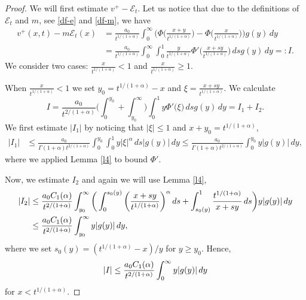 \documentclass{article}
\def\sE{{\mathscr{E}}}
\begin{document}
\begin{proof} We will first estimate $v^+ - \sE_t$.
Let us notice that due to the definitions of $\sE_t$ and $m$, see \eqref{df-e} and \eqref{df-m}, we have
\begin{align*}
v^+(x,t) - m\sE_t(x) &= \frac{a_0}{t^{1/(1+\alpha)}}
\int_0^\infty
\bigg( \Phi \bigg(\frac{x+y}{t^{1/(1+\alpha)}}\bigg)
-  \Phi \bigg(\frac{x}{t^{1/(1+\alpha)}}\bigg)\bigg)g(y)\, dy\\
&= \frac{a_0}{t^{1/(1+\alpha)}}
\int_0^\infty \int_0^1 \frac{y}{t^{1/(1+\alpha)}}
\Phi'\bigg(\frac{x+sy}{t^{1/(1+\alpha)}}\bigg)\, ds g(y)\, dy =:I
.
\end{align*}
We consider two cases: $\frac{x}{t^{1/(1+\alpha)}}< 1$ and  $\frac{x}{t^{1/(1+\alpha)}} \ge 1$. 

When $\frac{x}{t^{1/(1+\alpha)}}< 1$ we set $y_0 = t^{1/(1+\alpha)}- x$ and $\xi=\frac{x+sy}{t^{1/(1+\alpha)}}$. We calculate
$$
I = \frac{a_0}{t^{2/(1+\alpha)}} \bigg(\int_0^{y_0} + \int_{y_0}^\infty\bigg)\int_0^1 y \Phi'\big(\xi%
\big)\, ds g(y)\, dy = I_1 + I_2.
$$
We first estimate $|I_1|$ by noticing that $|\xi|\le1$ and $x+y_0= t^{1/(1+\alpha)}$,
\begin{align*}
 |I_1| &\le \frac{a_0}{\Gamma(1+\alpha)t^{2/(1+\alpha)}} \int_0^{y_0} \int_0^1y| \xi|^\alpha
\, ds |g(y)|\, dy
\le \frac{a_0}{\Gamma(1+\alpha)t^{2/(1+\alpha)}} 
\int_0^{y_0} y| g(y)| \, dy,   
\end{align*}
where we applied  Lemma \ref{l4} to bound $\Phi'.$

Now, we estimate $I_2$  and again we will use Lemma \ref{l4},
\begin{align*}
 |I_2 |&\le 
 \frac{a_0 C_1(\alpha)}%
 {t^{2/(1+\alpha)}} \int_{y_0}^\infty \bigg(
 \int_0^{s_0(y)} \bigg(\frac{x+sy}{t^{1/(1+\alpha)}}\bigg)^\alpha \, ds + \int_{s_0(y)}^1 
 \frac {t^{1/(1+\alpha)}}{x+sy}\,ds \bigg)y|g(y)|\, dy\\ &
 \le \frac{a_0 C_1(\alpha)}{%
 t^{2/(1+\alpha)}} \int_{y_0}^\infty y |g(y)|\, dy,
\end{align*}
where we set $s_0(y) = (t^{1/(1+\alpha)}-x)/y$ for $y\ge y_0$. %
Hence,
$$
|I| \le \frac{a_0 C_1(\alpha)}{%
t^{2/(1+\alpha)}} \int_{0}^\infty y |g(y)|\, dy
$$
for $x< t^{1/(1+\alpha)}$.


\end{proof}
\end{document}
